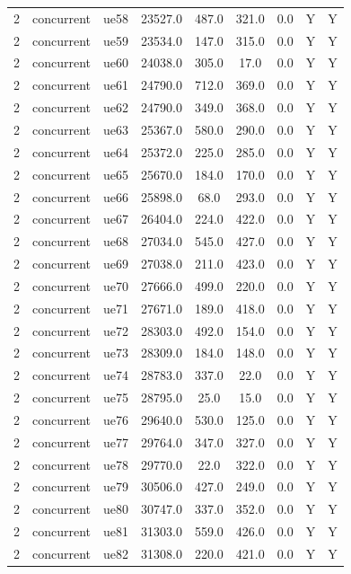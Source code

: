 \begin{table}[ht]
\begin{tabular}{|c|c|c|c|c|c|c|c|c|}
2 & concurrent & ue58 & 23527.0 & 487.0 & 321.0 & 0.0 & Y & Y \\
2 & concurrent & ue59 & 23534.0 & 147.0 & 315.0 & 0.0 & Y & Y \\
2 & concurrent & ue60 & 24038.0 & 305.0 & 17.0 & 0.0 & Y & Y \\
2 & concurrent & ue61 & 24790.0 & 712.0 & 369.0 & 0.0 & Y & Y \\
2 & concurrent & ue62 & 24790.0 & 349.0 & 368.0 & 0.0 & Y & Y \\
2 & concurrent & ue63 & 25367.0 & 580.0 & 290.0 & 0.0 & Y & Y \\
2 & concurrent & ue64 & 25372.0 & 225.0 & 285.0 & 0.0 & Y & Y \\
2 & concurrent & ue65 & 25670.0 & 184.0 & 170.0 & 0.0 & Y & Y \\
2 & concurrent & ue66 & 25898.0 & 68.0 & 293.0 & 0.0 & Y & Y \\
2 & concurrent & ue67 & 26404.0 & 224.0 & 422.0 & 0.0 & Y & Y \\
2 & concurrent & ue68 & 27034.0 & 545.0 & 427.0 & 0.0 & Y & Y \\
2 & concurrent & ue69 & 27038.0 & 211.0 & 423.0 & 0.0 & Y & Y \\
2 & concurrent & ue70 & 27666.0 & 499.0 & 220.0 & 0.0 & Y & Y \\
2 & concurrent & ue71 & 27671.0 & 189.0 & 418.0 & 0.0 & Y & Y \\
2 & concurrent & ue72 & 28303.0 & 492.0 & 154.0 & 0.0 & Y & Y \\
2 & concurrent & ue73 & 28309.0 & 184.0 & 148.0 & 0.0 & Y & Y \\
2 & concurrent & ue74 & 28783.0 & 337.0 & 22.0 & 0.0 & Y & Y \\
2 & concurrent & ue75 & 28795.0 & 25.0 & 15.0 & 0.0 & Y & Y \\
2 & concurrent & ue76 & 29640.0 & 530.0 & 125.0 & 0.0 & Y & Y \\
2 & concurrent & ue77 & 29764.0 & 347.0 & 327.0 & 0.0 & Y & Y \\
2 & concurrent & ue78 & 29770.0 & 22.0 & 322.0 & 0.0 & Y & Y \\
2 & concurrent & ue79 & 30506.0 & 427.0 & 249.0 & 0.0 & Y & Y \\
2 & concurrent & ue80 & 30747.0 & 337.0 & 352.0 & 0.0 & Y & Y \\
2 & concurrent & ue81 & 31303.0 & 559.0 & 426.0 & 0.0 & Y & Y \\
2 & concurrent & ue82 & 31308.0 & 220.0 & 421.0 & 0.0 & Y & Y \\

\end{tabular}
\end{table}
